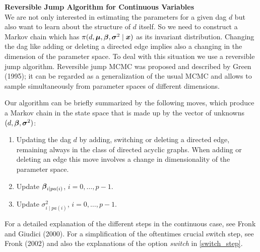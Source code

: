 \bigskip

{\bf Reversible Jump Algorithm for Continuous Variables} \\[0.2cm]
%
 We are not only
interested in estimating the parameters for a given dag $d$ but
also want to learn about the structure of $d$ itself. So we need
to construct a Markov chain which has $ \pi(d,\mbox{\boldmath $\mu$}, \mbox{\boldmath $\beta$},
\mbox{\boldmath $\sigma$}^2\mid \mbox{\boldmath $x$})$ as its invariant distribution. Changing the dag
like adding or deleting a directed edge implies also a changing in
the dimension of the parameter space. To deal with this situation
we use a reversible jump algorithm. Reversible jump MCMC was
proposed and described by Green (1995); it can be regarded as a
generalization of the usual MCMC and allows to sample
simultaneously from parameter spaces of different dimensions.

Our algorithm can be briefly summarized by the following moves,
which produce a Markov chain in the state space that is made up by
the vector of unknowns $(d,\mbox{\boldmath $\beta$},\mbox{\boldmath $\sigma$}^2)$:
%
\begin{enumerate}
\item Updating the dag $d$ by adding, switching or deleting a
directed edge, remaining always in the class of directed acyclic
graphs. When adding or deleting an edge this move involves a
change in dimensionality of the parameter space.
\item Update  $\mbox{\boldmath $\beta$}_{i\mid pa(i)}$, $i=0, \dots, p-1$.
\item Update $\sigma^2_{i\mid pa(i)}$, $i=0, \dots, p-1$.
\end{enumerate}
%
For a detailed explanation of the different steps in the
continuous case, see Fronk and Giudici (2000). For a
simplification of the oftentimes crucial switch step, see Fronk
(2002) and also the explanations of the option {\it switch} in
\autoref{switch_step}.



\vfill
\bigskip

\newpage

